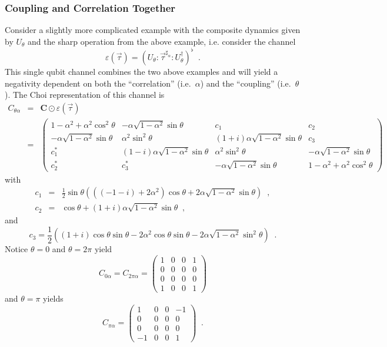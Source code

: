 \subsubsection{Coupling and Correlation Together}
Consider a slightly more complicated example with the composite dynamics given by $U_\theta$ and the sharp operation from the above example, i.e. consider the channel\
$$
\varepsilon(\vec{\tau}) = \left(U_\theta:\vec{\tau}^{\sharp_\alpha}:U_\theta^\dagger\right)^\flat\;\;.
$$
This single qubit channel combines the two above examples and will yield a negativity dependent on both the ``correlation'' (i.e.\ $\alpha$) and the ``coupling'' (i.e.\ $\theta$).  The Choi representation of this channel is
\begin{eqnarray*}
C_{\theta\alpha} &=& \mathbf{C}\odot \varepsilon(\vec{\tau})\\
 &=& \begin{pmatrix}
 1-\alpha^2+\alpha^2 \cos^2\theta & -\alpha \sqrt{1-\alpha^2} \sin\theta & c_1 & c_2 \\
 
 -\alpha \sqrt{1-\alpha^2} \sin\theta & \alpha^2 \sin^2\theta & (1+i) \alpha \sqrt{1-\alpha^2} \sin\theta & c_3 \\
 
c_1^* & (1-i) \alpha \sqrt{1-\alpha^2} \sin\theta & \alpha^2 \sin^2\theta & -\alpha \sqrt{1-\alpha^2} \sin\theta \\
 
c_2^* & c_3^* & -\alpha \sqrt{1-\alpha^2} \sin\theta & 1-\alpha^2+\alpha^2 \cos^2\theta
\end{pmatrix}
\end{eqnarray*}
with
\begin{eqnarray*}
c_1 &=& \frac{1}{2} \sin\theta \left(\left((-1-i)+2 \alpha^2\right) \cos\theta+2 \alpha \sqrt{1-\alpha^2} \sin\theta\right)\;\;,\\
c_2 &=& \cos\theta+(1+i) \alpha \sqrt{1-\alpha^2} \sin\theta\;\;,
\end{eqnarray*}
and
$$
c_3 = \frac{1}{2} \left((1+i) \cos\theta \sin\theta-2 \alpha^2 \cos\theta \sin\theta-2 \alpha \sqrt{1-\alpha^2} \sin^2\theta\right)\;\;.
$$
Notice $\theta=0$ and $\theta=2\pi$ yield
$$
C_{0\alpha} = C_{2\pi\alpha} = \begin{pmatrix}
 1&0&0&1\\
 0&0&0&0\\
 0&0&0&0\\
 1&0&0&1
\end{pmatrix}
$$  
and $\theta=\pi$ yields
$$
C_{\pi\alpha} = \begin{pmatrix}
 1&0&0&-1\\
 0&0&0&0\\
 0&0&0&0\\
 -1&0&0&1
\end{pmatrix}\;\;.
$$ 
